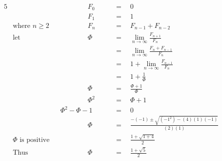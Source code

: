\begin{alignat*}{5}
&\,&&\qquad\qquad F_0\quad&&\,=\quad0\\
&\,&&\qquad\qquad F_1\quad&&\,=\quad1\\
&\text{where }n\geqslant2&&\qquad\qquad F_n\quad&&\,=\quad F_{n-1}+F_{n-2}\\
&\text{let }&&\qquad\qquad\Phi\quad&&\,=\quad\lim_{n\to\infty}\frac{F_{n+1}}{F_n}\\
&\,&&\,&&\,=\quad\lim_{n\to\infty}\frac{F_n+F_{n-1}}{F_n}\\
&\,&&\,&&\,=\quad1+\lim_{n\to\infty}\frac{F_{n-1}}{F_n}\\
&\,&&\,&&\,=\quad1+\frac{1}{\Phi}\\
&\,&&\qquad\qquad\Phi\quad&&\,=\quad\frac{\Phi+1}{\Phi}\\
&\,&&\qquad\qquad\Phi^2\quad&&\,=\quad\Phi+1\\
&\,&&\Phi^2-\Phi-1\quad&&\,=\quad0\\
&\,&&\qquad\qquad\Phi\quad&&\,=\quad\frac{-(-1)\pm\sqrt{(-1^2)-(4)(1)(-1)}}{(2)(1)}\\
&\Phi\text{ is positive}&&\,&&\,=\quad\frac{1+\sqrt{1+4}}{2}\\
&\text{Thus}&&\qquad\qquad\Phi\quad&&\,=\quad\frac{1+\sqrt{5}}{2}
\end{alignat*}
